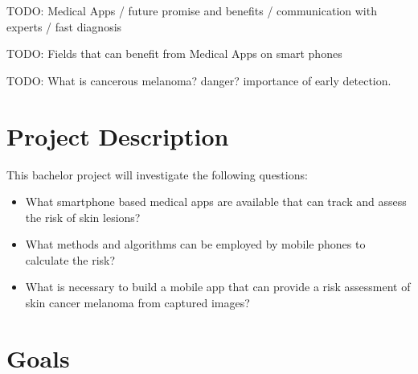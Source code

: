 
TODO: Medical Apps / future promise and benefits / communication with experts / fast diagnosis

TODO: Fields that can benefit from Medical Apps on smart phones

TODO: What is cancerous melanoma? danger? importance of early detection.


\section{Project Description}

This bachelor project will investigate the following questions:

\noindent
\begin{itemize}
\item What smartphone based medical apps are available that can track and assess the risk of skin lesions?
\item What methods and algorithms can be employed by mobile phones to calculate the risk?
\item What is necessary to build a mobile app that can provide a risk assessment of skin cancer melanoma from captured images?

\end{itemize}

\section{Goals}

